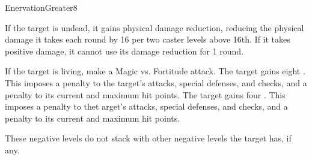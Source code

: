 \begin{spellsection}{Enervation}{Greater}{8}
\begin{spellheader}
\end{spellheader}
\begin{spellcontent}
    \begin{spelltargetinginfo}
    \end{spelltargetinginfo}
    \begin{spelleffects}
        \spelleffect If the target is undead, it gains physical damage reduction, reducing the physical damage it takes each round by 16  per two caster levels above 16th. If it takes positive damage, it cannot use its damage reduction for 1 round.
        \begin{spellattacktriggered}{If the target is living, make a Magic vs. Fortitude attack.}
            \spellsuccess The target gains eight . This imposes a  penalty to the target's attacks, special defenses, and checks, and a  penalty to its current and maximum hit points.
            \spellsuccess The target gains four . This imposes a  penalty to thet arget's attacks, special defenses, and checks, and a  penalty to its current and maximum hit points.
        \end{spellattacktriggered}
    \end{spelleffects}
\end{spellcontent}
\begin{spellfooter}
    \spellnotes These negative levels do not stack with other negative levels the target has, if any.
\end{spellfooter}
\end{spellsection}

